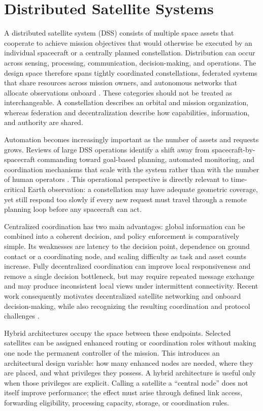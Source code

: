 \section{Distributed Satellite Systems}

A distributed satellite system (DSS) consists of multiple space assets that cooperate to achieve mission objectives that would otherwise be executed by an individual spacecraft or a centrally planned constellation. Distribution can occur across sensing, processing, communication, decision-making, and operations. The design space therefore spans tightly coordinated constellations, federated systems that share resources across mission owners, and autonomous networks that allocate observations onboard \citep{Golkar2015,Scrocciolani2024}. These categories should not be treated as interchangeable. A constellation describes an orbital and mission organization, whereas federation and decentralization describe how capabilities, information, and authority are shared.

Automation becomes increasingly important as the number of assets and requests grows. Reviews of large DSS operations identify a shift away from spacecraft-by-spacecraft commanding toward goal-based planning, automated monitoring, and coordination mechanisms that scale with the system rather than with the number of human operators \citep{BenLarbi2021}. This operational perspective is directly relevant to time-critical Earth observation: a constellation may have adequate geometric coverage, yet still respond too slowly if every new request must travel through a remote planning loop before any spacecraft can act.

Centralized coordination has two main advantages: global information can be combined into a coherent decision, and policy enforcement is comparatively simple. Its weaknesses are latency to the decision point, dependence on ground contact or a coordinating node, and scaling difficulty as task and asset counts increase. Fully decentralized coordination can improve local responsiveness and remove a single decision bottleneck, but may require repeated message exchange and may produce inconsistent local views under intermittent connectivity. Recent work consequently motivates decentralized satellite networking and onboard decision-making, while also recognizing the resulting coordination and protocol challenges \citep{Oh2024}.

Hybrid architectures occupy the space between these endpoints. Selected satellites can be assigned enhanced routing or coordination roles without making one node the permanent controller of the mission. This introduces an architectural design variable: how many enhanced nodes are needed, where they are placed, and what privileges they possess. A hybrid architecture is useful only when those privileges are explicit. Calling a satellite a ``central node'' does not itself improve performance; the effect must arise through defined link access, forwarding eligibility, processing capacity, storage, or coordination rules.

